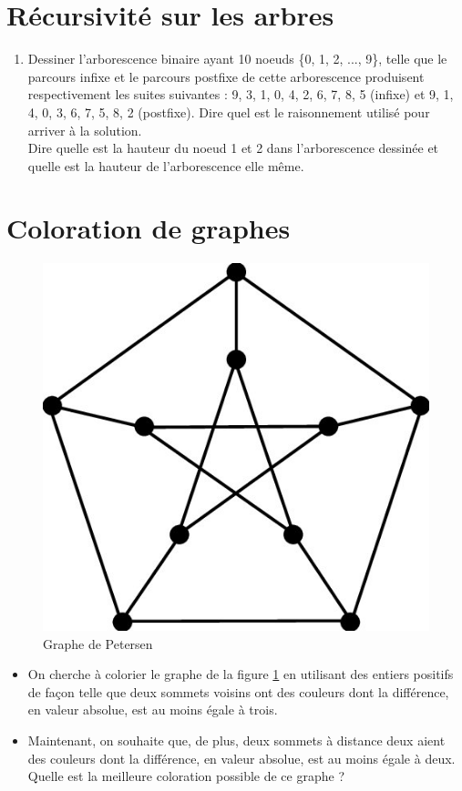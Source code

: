 \documentclass{article}[12pt]
\begin{document}
\section*{Récursivité sur les arbres}
\begin{enumerate}
\item Dessiner l'arborescence binaire ayant 10 noeuds \{0, 1, 2, ..., 9\}, telle que le parcours infixe et le parcours postfixe de cette arborescence produisent respectivement les suites suivantes : 9, 3, 1, 0, 4, 2, 6, 7, 8, 5 (infixe) et 9, 1, 4, 0, 3, 6, 7, 5, 8, 2 (postfixe). Dire quel est le raisonnement utilisé pour arriver à la solution.\\ Dire quelle est la hauteur du noeud 1 et 2 dans l'arborescence dessinée et quelle est la hauteur de l'arborescence elle même. \\

\end{enumerate}

\section*{Coloration de graphes}

\begin{figure}[h!]
    \centering
    \includegraphics[scale=0.25]{Petersen.png}
    \caption{Graphe de Petersen}
    \label{fig:petersen}
\end{figure}
\begin{itemize}
    \item On cherche à colorier le graphe de la figure \ref{fig:petersen} en utilisant des entiers positifs de façon telle que deux sommets voisins ont des couleurs dont la différence, en valeur absolue, est au moins égale à trois.
    \item Maintenant, on souhaite que, de plus, deux sommets à distance deux aient des couleurs dont la différence, en valeur absolue, est au moins égale à deux. Quelle est la meilleure coloration possible de ce graphe ?

\end{itemize}
\end{document}
